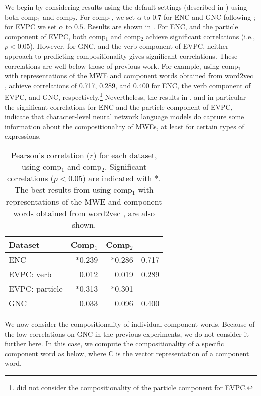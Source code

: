 \documentclass[11pt]{article}
\newcommand{\compone}{comp$_1$\xspace}
\newcommand{\comptwo}{comp$_2$\xspace}
\begin{document}
We begin by considering results using the default settings (described
in ) using both \compone and \comptwo. For
\compone, we set $\alpha$ to $0.7$ for ENC and GNC following
\cite{Salehi+:2015}; for EVPC we set $\alpha$ to $0.5$. Results are
shown in . For ENC, and the particle component
of EVPC, both \compone and \comptwo achieve significant correlations
(i.e., $p<0.05$). However, for GNC, and the verb component of EVPC,
neither approach to predicting compositionality gives significant
correlations. These correlations are well below those of previous
work. For example, using \compone with representations of the MWE and
component words obtained from word2vec \citep{Mikolov+:2013b},
\cite{Salehi+:2015} achieve correlations of 0.717, 0.289, and 0.400
for ENC, the verb component of EVPC, and GNC,
respectively.\footnote{\cite{Salehi+:2015} did not consider the
  compositionality of the particle component for EVPC.} Nevertheless,
the results in , and in particular the
significant correlations for ENC and the particle component of EVPC,
indicate that character-level neural network language models do
capture some information about the compositionality of MWEs, at least
for certain types of expressions.

\begin{table}
\begin{center}
\begin{tabular}{lrrc}
Dataset & Comp$_1$ & Comp$_2$ & \cite{Salehi+:2015}\\
\hline
ENC            & *0.239 & *0.286 & 0.717\\
EVPC: verb     & 0.012 & 0.019   & 0.289\\
EVPC: particle & *0.313 & *0.301 & -\\
GNC            & $-$0.033 & $-$0.096 & 0.400\\
\end{tabular}
\caption{Pearson's correlation ($r$) for each dataset, using comp$_1$
  and comp$_2$. Significant correlations ($p<0.05$) are indicated with
  *. The best results from \cite{Salehi+:2015} using \compone with
  representations of the MWE and component words obtained from
  word2vec \citep{Mikolov+:2013b}, are also shown.
\label{tab:results:default}}
\end{center}
\end{table}


We now consider the compositionality of individual component
words. Because of the low correlations on GNC in the previous
experiments, we do not consider it further here. In this case, we
compute the compositionality of a specific component word as below,
where $\mathrm{C}$ is the vector representation of a component word.
\end{document}
